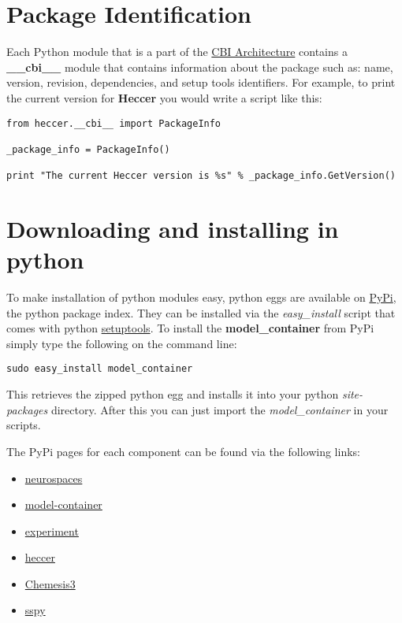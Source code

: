 \documentclass[12pt]{article}
\begin{document}
\section*{Package Identification}

	Each Python module that is a part of the \href{../cbi-architecture/cbi-architecture.tex}{CBI Architecture} contains a {\bf \_\_cbi\_\_} module that contains information about the package such as: name, version, revision, dependencies, and setup tools identifiers. For example, to print the current version for {\bf Heccer} you would write a script like this:
	
\begin{verbatim}
from heccer.__cbi__ import PackageInfo

_package_info = PackageInfo()

print "The current Heccer version is %s" % _package_info.GetVersion()

\end{verbatim}

\section*{Downloading and installing in python}

	To make installation of python modules easy, python eggs are available on \href{http://pypi.python.org/}{PyPi}, the python package index.  They can be installed via the {\it easy\_install} script that comes with python \href{http://pypi.python.org/pypi?:action=display&name=setuptools}{setuptools}. To install the {\bf model\_container} from PyPi simply type the following on the command line:
	
\begin{verbatim}
sudo easy_install model_container 
\end{verbatim}

This retrieves the zipped python egg and installs it into your python {\it site-packages} directory. After this you can just import the {\it model\_container} in your scripts. 

The PyPi pages for each component can be found via the following links:

\begin{itemize}
\item[] \href{http://pypi.python.org/pypi/neurospaces}{neurospaces}
\item[] \href{http://pypi.python.org/pypi/model-container}{model-container}
\item[] \href{http://pypi.python.org/pypi/experiment}{experiment}
\item[] \href{http://pypi.python.org/pypi/heccer}{heccer}
\item[] \href{http://pypi.python.org/pypi/chemesis3}{Chemesis3}
\item[] \href{http://pypi.python.org/pypi/sspy}{sspy}
\end{itemize}
\end{document}
